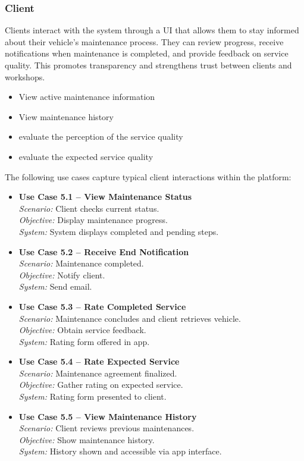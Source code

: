 \subsubsection{Client}

Clients interact with the system through a \ac{UI} that allows them to stay informed about their vehicle’s maintenance process. They can review progress, receive notifications when maintenance is completed, and provide feedback on service quality. This promotes transparency and strengthens trust between clients and workshops.


\begin{itemize}
    \item View active maintenance information
    \item View maintenance history
    \item evaluate the perception of the service quality 
    \item evaluate the expected service quality 
\end{itemize}

The following use cases capture typical client interactions within the platform:

\begin{itemize}
    \item \textbf{Use Case 5.1 – View Maintenance Status}\\
    \textit{Scenario:} Client checks current status.\\
    \textit{Objective:} Display maintenance progress.\\
    \textit{System:} System displays completed and pending steps.
    \item \textbf{Use Case 5.2 – Receive End Notification}\\
    \textit{Scenario:} Maintenance completed.\\
    \textit{Objective:} Notify client.\\
    \textit{System:} Send email.
    \item \textbf{Use Case 5.3 – Rate Completed Service}\\
    \textit{Scenario:} Maintenance concludes and client retrieves vehicle.\\
    \textit{Objective:} Obtain service feedback.\\
    \textit{System:} Rating form offered in app.
    \item \textbf{Use Case 5.4 – Rate Expected Service}\\
    \textit{Scenario:} Maintenance agreement finalized.\\
    \textit{Objective:} Gather rating on expected service.\\
    \textit{System:} Rating form presented to client.
    \item \textbf{Use Case 5.5 – View Maintenance History}\\
    \textit{Scenario:} Client reviews previous maintenances.\\
    \textit{Objective:} Show maintenance history.\\
    \textit{System:} History shown and accessible via app interface.
\end{itemize}


